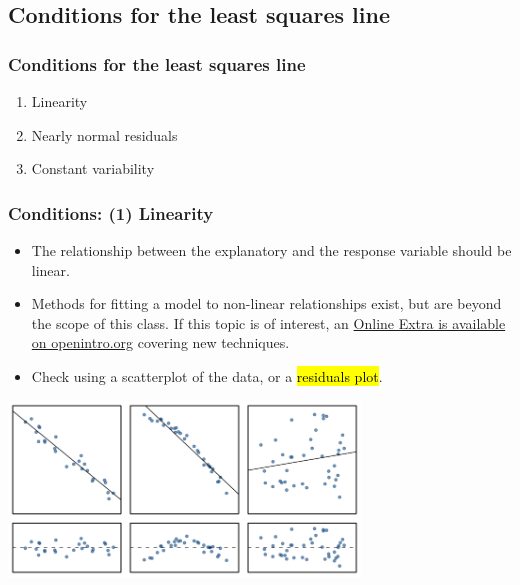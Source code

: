 
\subsection{Conditions for the least squares line}


\begin{frame}
\frametitle{Conditions for the least squares line}

\begin{enumerate}

\item Linearity

\pause

\item Nearly normal residuals

\pause

\item Constant variability

\end{enumerate}

\end{frame}


\begin{frame}
\frametitle{Conditions: (1) Linearity}

\begin{itemize}

\item The relationship between the explanatory and the response variable should be linear. 

\pause

\item Methods for fitting a model to non-linear relationships exist, but are beyond the scope of this class. If this topic is of interest, an \href{http://www.openintro.org/download.php?file=os2_extra_nonlinear_relationships&referrer=/stat/textbook.php}{Online Extra is available on openintro.org} covering new techniques.

\pause

\item Check using a scatterplot of the data, or a \hl{residuals plot}.

\end{itemize}

\begin{center}
\includegraphics[width=0.7\textwidth]{8-2_least_square_reg/figures/sampleLinesAndResPlots/sampleLinesAndResPlots}
\end{center}

\end{frame}

